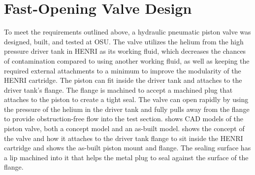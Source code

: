 \section{Fast-Opening Valve Design} \label{s:design}

To meet the requirements outlined above, a hydraulic pneumatic piston valve was designed, built, and tested at OSU.
The valve utilizes the helium from the high pressure driver tank in HENRI as its working fluid, which decreases the chances of contamination compared to using another working fluid, as well as keeping the required external attachments to a minimum to improve the modularity of the HENRI cartridge.
The piston can fit inside the driver tank and attaches to the driver tank's flange.
The flange is machined to accept a machined plug that attaches to the piston to create a tight seal.
The valve can open rapidly by using the pressure of the helium in the driver tank and fully pulls away from the flange to provide obstruction-free flow into the test section.
 shows CAD models of the piston valve, both a concept model and an as-built model.
 shows the concept of the valve and how it attaches to the driver tank flange to sit inside the HENRI cartridge and  shows the as-built piston mount and flange.
The sealing surface has a lip machined into it that helps the metal plug to seal against the surface of the flange.

